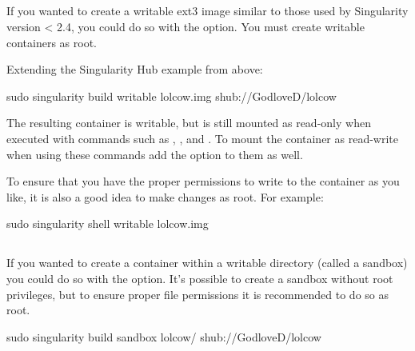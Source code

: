 \documentclass[letterpaper,10pt,english]{sphinxmanual}
\begin{document}
\subsection{}
\label{\detokenize{build_a_container:writable}}
If you wanted to create a writable ext3 image similar to those used by
Singularity version \textless{} 2.4, you could do so with the  option. You must
create writable containers as root.

Extending the Singularity Hub example from above:

%
\begin{sphinxVerbatim}[commandchars=\\\{\}]
\PYGZdl{} sudo singularity build \PYGZhy{}\PYGZhy{}writable lolcow.img shub://GodloveD/lolcow
\end{sphinxVerbatim}

The resulting container is writable, but is still mounted as read-only
when executed with commands such as , , and . To mount the container
as read-write when using these commands add the  option to them as
well.

To ensure that you have the proper permissions to write to the
container as you like, it is also a good idea to make changes as root.
For example:

%
\begin{sphinxVerbatim}[commandchars=\\\{\}]
\PYGZdl{} sudo singularity shell \PYGZhy{}\PYGZhy{}writable lolcow.img
\end{sphinxVerbatim}


\subsection{}
\label{\detokenize{build_a_container:sandbox}}
If you wanted to create a container within a writable directory (called
a sandbox) you could do so with the  option. It’s possible to create a
sandbox without root privileges, but to ensure proper file permissions
it is recommended to do so as root.

%
\begin{sphinxVerbatim}[commandchars=\\\{\}]
\PYGZdl{} sudo singularity build \PYGZhy{}\PYGZhy{}sandbox lolcow/ shub://GodloveD/lolcow
\end{sphinxVerbatim}
\end{document}
